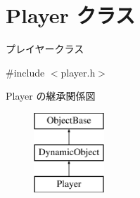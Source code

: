 \hypertarget{class_player}{}\section{Player クラス}
\label{class_player}


プレイヤークラス  




{\ttfamily \#include $<$player.\+h$>$}

Player の継承関係図\begin{figure}[H]
\begin{center}
\leavevmode
\includegraphics[height=3.000000cm]{class_player}
\end{center}
\end{figure}
